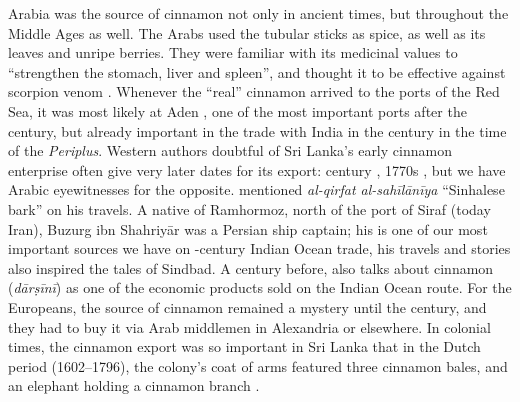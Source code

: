 Arabia was the source of cinnamon not only in ancient times, but throughout the Middle Ages as well. The Arabs used the tubular sticks as spice, as well as its leaves and unripe berries. They were familiar with its medicinal values to ``strengthen the stomach, liver and spleen'', and thought it to be effective against scorpion venom \parencite{dietrich_dar_2004}. Whenever the ``real'' cinnamon arrived to the ports of the Red Sea, it was most likely at Aden \parencite{dietrich_dar_2004}, one of the most important ports after the  century, but already important in the trade with India in the  century \AD{} in the time of the \textit{Periplus}. 
Western authors doubtful of Sri Lanka's early cinnamon enterprise often give very later dates for its export:  century \parencite{dietrich_dar_2004}, 1770s \parencites[referring to William Dymock]{alam_darcini_2011}, but we have Arabic eyewitnesses for the opposite. \textcite[126]{buzurg_ibn_shahriyar_kitab_1908} mentioned \textit{al-qirfat al-sahīlānīya} ``Sinhalese bark'' on his travels. A native of Ramhormoz, north of the port of Siraf (today Iran), Buzurg ibn Shahriyār was a Persian ship captain; his  is one of our most important sources we have on -century Indian Ocean trade, his travels and stories also inspired the tales of Sindbad. A century before, \parencite{ibn_khurdadhbih_kitab_870} also talks about cinnamon (\textit{dārṣīnī}) as one of the economic products sold on the Indian Ocean route. For the Europeans, the source of cinnamon remained a mystery until the  century, and they had to buy it via Arab middlemen in Alexandria or elsewhere. In colonial times, the cinnamon export was so important in Sri Lanka that in the Dutch period (1602–1796), the colony's coat of arms featured three cinnamon bales, and an elephant holding a cinnamon branch \parencite{hartemink_national_1995}.




